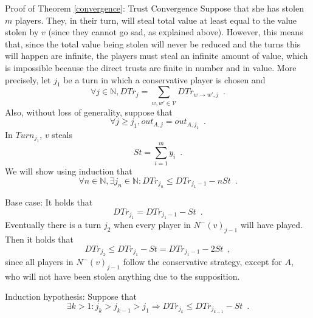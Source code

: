 \begin{sepproof}{Proof of Theorem \ref{convergence}: Trust Convergence}
   Suppose that she has stolen $m$ players. They, in their turn, will steal total value at least equal to the value
   stolen by $v$ (since they cannot go sad, as explained above). However, this means that, since the total value being
   stolen will never be reduced and the turns this will happen are infinite, the players must steal an infinite amount of
   value, which is impossible because the direct trusts are finite in number and in value. More precisely, let $j_1$ be
   a turn in which a conservative player is chosen and
   \begin{equation*}
      \forall j \in \mathbb{N}, DTr_j = \sum\limits_{w,w' \in \mathcal{V}}DTr_{w \rightarrow w', j} \enspace.
   \end{equation*}
   Also, without loss of generality, suppose that
   \begin{equation*}
      \forall j \geq j_1, out_{A, j} = out_{A, j_1} \enspace.
   \end{equation*}
   In $Turn_{j_1}$, $v$ steals
   \begin{equation*}
      St = \sum\limits_{i=1}^{m}y_i \enspace.
   \end{equation*}
   We will show using induction that
   \begin{equation*}
      \forall n \in \mathbb{N}, \exists j_n \in \mathbb{N} : DTr_{j_n} \leq DTr_{j_1-1} - nSt \enspace.
   \end{equation*}

   Base case: It holds that
   \begin{equation*}
      DTr_{j_1} = DTr_{j_1-1} - St \enspace.
   \end{equation*}
   Eventually there is a turn $j_2$ when every player in $N^{-}(v)_{j-1}$ will have played. Then it holds that
   \begin{equation*}
      DTr_{j_2} \leq DTr_{j_1} - St = DTr_{j_1-1} - 2St \enspace,
   \end{equation*}
   since all players in $N^{-}(v)_{j-1}$ follow the conservative strategy, except for $A$, who will not have been stolen
   anything due to the supposition.

   Induction hypothesis: Suppose that
   \begin{equation*}
      \exists k > 1 : j_k > j_{k-1} > j_1 \Rightarrow DTr_{j_k} \leq DTr_{j_{k-1}} - St \enspace.
   \end{equation*}


\end{sepproof}
